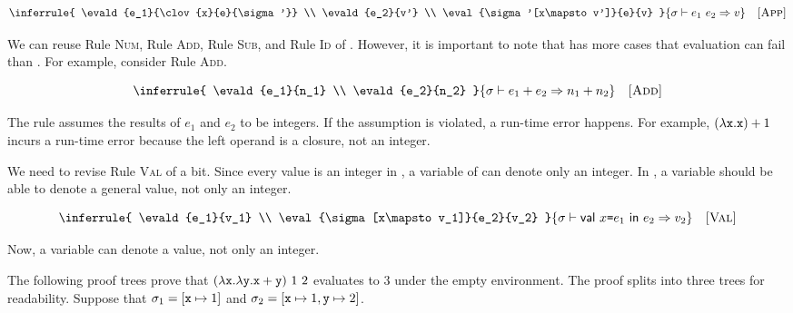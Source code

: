 \[
  \inferrule
  {
    \evald{e_1}{\clov{x}{e}{\sigma'}} \\
    \evald{e_2}{v'} \\
    \eval{\sigma'[x\mapsto v']}{e}{v}
  }
  { \evald{\eapp{e_1}{e_2}}{v} }
  \quad\textsc{[App]}
\]

We can reuse Rule \textsc{Num}, Rule \textsc{Add}, Rule \textsc{Sub}, and Rule \textsc{Id} of
\plang. However, it is important to note that \lang has more
cases that evaluation can fail than \plang. For example, consider Rule \textsc{Add}.


\vspace{-1em}

\[
  \inferrule
  {
    \evald{e_1}{n_1} \\
    \evald{e_2}{n_2}
  }
  { \evald{\eadd{e_1}{e_2}}{n_1+n_2} }
  \quad\textsc{[Add]}
\]

The rule assumes the results of $e_1$ and $e_2$ to be integers. If the
assumption is violated, a run-time error happens. For example,
$(\lambda\texttt{x}.\texttt{x})+1$ incurs a run-time error because the left operand
is a closure, not an integer.

We need to revise Rule \textsc{Val} of \plang a bit.
Since every value is an integer in \plang, a variable of \plang can denote only
an integer. In \lang, a variable should be able to denote a general value, not
only an integer.


\vspace{-1em}

\[
  \inferrule
  {
    \evald{e_1}{v_1} \\
    \eval{\sigma[x\mapsto v_1]}{e_2}{v_2}
  }
  { \evald{\ebind{x}{e_1}{e_2}}{v_2} }
  \quad\textsc{[Val]}
\]

Now, a variable can denote a value, not only an integer.

The following proof trees prove that
$(\lambda\texttt{x}.\lambda\texttt{y}.\texttt{x}+\texttt{y})\ 1\ 2$
evaluates to $3$ under the empty environment.
The proof splits into three trees for readability.
Suppose that $\sigma_1=[\texttt{x}\mapsto1]$ and $\sigma_2=[\texttt{x}\mapsto1,\texttt{y}\mapsto2]$.


